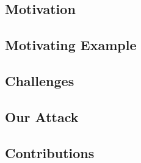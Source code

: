 \placeholder

\subsection{Motivation}
\placeholder

\subsection{Motivating Example}
\placeholder

\subsection{Challenges}
\placeholder

\subsection{Our Attack}
\placeholder

\subsection{Contributions}
\placeholder
